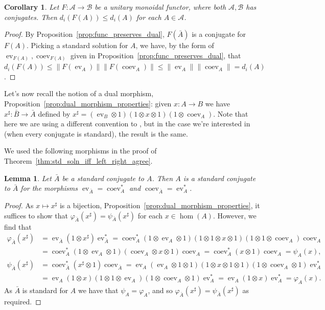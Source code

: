 \documentclass[a4paper,11pt]{article}
\theoremstyle{plain}
\newtheorem{corollary}[proposition]{Corollary}
\newtheorem{lemma}[proposition]{Lemma}
\theoremstyle{remark}
\newcommand{\mc}[1]{\mathcal{#1}}
\newcommand{\ev}{\operatorname{ev}}
\newcommand{\coev}{\operatorname{coev}}
\newcommand{\conj}[1]{\bar{#1}}
\begin{document}
\begin{corollary}
Let $F \colon \mc A \to \mc B$ be a unitary monoidal functor, where both $\mc A,\mc B$ has conjugates.  Then $d_i(F(A)) \leq d_i(A)$ for each $A\in\mc A$.
\end{corollary}
\begin{proof}
By Proposition~\ref{prop:func_preserves_dual}, $F(\conj A)$ is a conjugate for $F(A)$.  Picking a standard solution for $A$, we have, by the form of $\ev_{F(A)}, \coev_{F(A)}$ given in Proposition~\ref{prop:func_preserves_dual}, that $d_i(F(A)) \leq \| F(\ev_A) \| \| F(\coev_A) \| \leq \| \ev_A \| \|\coev_A\| = d_i(A)$.
\end{proof}

Let's now recall the notion of a dual morphism, Proposition~\ref{prop:dual_morphism_properties}: given $x\colon A \to B$ we have $x^\sharp \colon \conj B \to \conj A$ defined by $x^\sharp = (\ev_B\otimes 1)(1\otimes x\otimes 1)(1\otimes\coev_A)$.  
Note that here we are using a different convention to \cite[Theorem~2.2.21]{NT_CQGsBook}, but in the case we're interested in (when every conjugate is standard), the result is the same.

We used the following morphisms in the proof of Theorem~\ref{thm:std_soln_iff_left_right_agree}.

\begin{lemma}\label{lem:conjconj}
Let $\conj A$ be a standard conjugate to $A$.  Then $A$ is a standard conjugate to $\conj A$ for the morphisms $\ev_{\conj A} = \coev_A^*$ and $\coev_{\conj A} = \ev_A^*$.
\end{lemma}
\begin{proof}
As $x\mapsto x^\sharp$ is a bijection, Proposition~\ref{prop:dual_morphism_properties}, it suffices to show that $\varphi_{\conj A}(x^\sharp) = \psi_{\conj A}(x^\sharp)$ for each $x\in\hom(A)$.  However, we find that
\begin{align*}
\varphi_{\conj A}(x^\sharp)
&= \ev_{\conj A}(1\otimes x^\sharp) \ev_{\conj A}^*
= \coev_A^* (1\otimes\ev_A\otimes 1)(1\otimes 1\otimes x\otimes 1)(1\otimes 1\otimes\coev_A) \coev_A \\
&= \coev_A^* (1\otimes\ev_A\otimes 1)(\coev_A\otimes x\otimes 1)\coev_A
= \coev_A^*( x\otimes 1) \coev_A = \psi_A(x), \\
\psi_{\conj A}(x^\sharp)
&= \coev_{\conj A}^* (x^\sharp\otimes 1) \coev_{\conj A}
= \ev_A (\ev_A\otimes 1\otimes 1)(1\otimes x\otimes 1\otimes 1)(1\otimes\coev_A\otimes 1)\ev_A^* \\
&= \ev_A (1\otimes x)(1\otimes 1\otimes\ev_A)(1\otimes\coev_A\otimes 1)\ev_A^*
= \ev_A (1\otimes x)\ev_A^* = \varphi_A(x).
\end{align*}
As $\conj A$ is standard for $A$ we have that $\psi_A = \varphi_A$, and so  $\varphi_{\conj A}(x^\sharp) = \psi_{\conj A}(x^\sharp)$ as required.
\end{proof}
\end{document}
